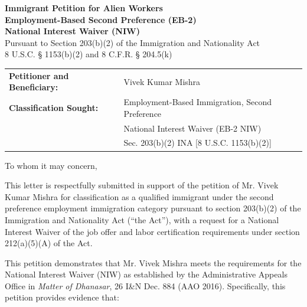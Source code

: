 \documentclass[11pt]{article}
\title{}
\date{}
\newcommand{\dr}{Mr. Vivek Mishra }
\begin{document}
\newcommand{\tc}[1]{\textcolor{blue}{#1}}


\begin{center}
 \Large{\textbf{Immigrant Petition for Alien Workers}}\\
 \vspace{0.5em}
 \large{\textbf{Employment-Based Second Preference (EB-2)}}\\
 \large{\textbf{National Interest Waiver (NIW)}}\\
 \vspace{0.5em}
 \normalsize{Pursuant to Section 203(b)(2) of the Immigration and Nationality Act}\\
 \normalsize{8 U.S.C. § 1153(b)(2) and 8 C.F.R. § 204.5(k)}
\end{center}

\vspace{4em}


\begin{tabular}{ll}
\textbf{Petitioner and Beneficiary:} & Vivek Kumar Mishra\\
\textbf{Classification Sought:} & Employment-Based Immigration, Second Preference\\
& National Interest Waiver (EB-2 NIW)\\
& Sec. 203(b)(2) INA [8 U.S.C. 1153(b)(2)]\\
\end{tabular}

\vspace{2em}


To whom it may concern,

\vspace{2em}

This letter is respectfully submitted in support of the petition of Mr. Vivek Kumar Mishra for classification as a qualified immigrant under the second preference employment immigration category pursuant to section 203(b)(2) of the Immigration and Nationality Act (``the Act''), with a request for a National Interest Waiver of the job offer and labor certification requirements under section 212(a)(5)(A) of the Act.

\vspace{1em}

This petition demonstrates that \dr meets the requirements for the National Interest Waiver (NIW) as established by the Administrative Appeals Office in \textit{Matter of Dhanasar}, 26 I\&N Dec. 884 (AAO 2016). Specifically, this petition provides evidence that:
\end{document}
